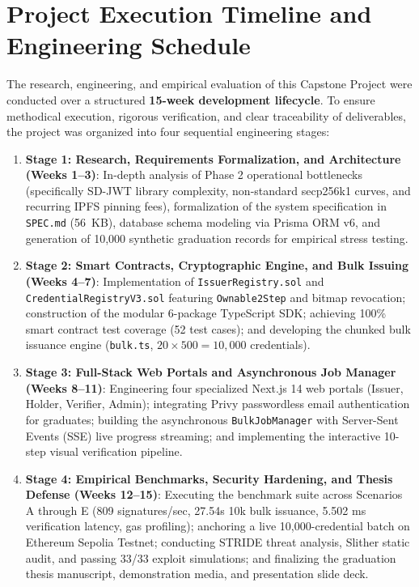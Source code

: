 \chapter{Project Execution Timeline and Engineering Schedule}
\label{app:timeline}

The research, engineering, and empirical evaluation of this Capstone Project were conducted over a structured \textbf{15-week development lifecycle}. To ensure methodical execution, rigorous verification, and clear traceability of deliverables, the project was organized into four sequential engineering stages:
\begin{enumerate}
    \item \textbf{Stage 1: Research, Requirements Formalization, and Architecture (Weeks 1--3)}: In-depth analysis of Phase 2 operational bottlenecks (specifically SD-JWT library complexity, non-standard secp256k1 curves, and recurring IPFS pinning fees), formalization of the system specification in \texttt{SPEC.md} (56~KB), database schema modeling via Prisma ORM v6, and generation of 10,000 synthetic graduation records for empirical stress testing.
    \item \textbf{Stage 2: Smart Contracts, Cryptographic Engine, and Bulk Issuing (Weeks 4--7)}: Implementation of \texttt{IssuerRegistry.sol} and \texttt{CredentialRegistryV3.sol} featuring \texttt{Ownable2Step} and bitmap revocation; construction of the modular 6-package TypeScript SDK; achieving 100\% smart contract test coverage (52 test cases); and developing the chunked bulk issuance engine (\texttt{bulk.ts}, $20 \times 500 = 10,000$ credentials).
    \item \textbf{Stage 3: Full-Stack Web Portals and Asynchronous Job Manager (Weeks 8--11)}: Engineering four specialized Next.js 14 web portals (Issuer, Holder, Verifier, Admin); integrating Privy passwordless email authentication for graduates; building the asynchronous \texttt{BulkJobManager} with Server-Sent Events (SSE) live progress streaming; and implementing the interactive 10-step visual verification pipeline.
    \item \textbf{Stage 4: Empirical Benchmarks, Security Hardening, and Thesis Defense (Weeks 12--15)}: Executing the benchmark suite across Scenarios A through E (809 signatures/sec, 27.54s 10k bulk issuance, 5.502 ms verification latency, gas profiling); anchoring a live 10,000-credential batch on Ethereum Sepolia Testnet; conducting STRIDE threat analysis, Slither static audit, and passing 33/33 exploit simulations; and finalizing the graduation thesis manuscript, demonstration media, and presentation slide deck.
\end{enumerate}

